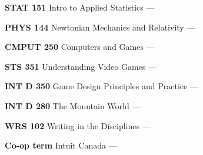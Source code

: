 \begin{cventries}
{\begin{multicols}{2}
\begin{cvitems}
        \item {\textbf{STAT 151} Intro to Applied Statistics --- }
          \vspace{0.5mm}
        \item {\textbf{PHYS 144} Newtonian Mechanics and Relativity --- }
          \vspace{1.5mm}
        \item {\textbf{CMPUT 250} Computers and Games --- }
          \vspace{0.5mm}
        \item {\textbf{STS 351} Understanding Video Games --- }
          \vspace{0.5mm}
        \item {\textbf{INT D 350} Game Design Principles and Practice --- }
          \vspace{1.5mm}
        \item {\textbf{INT D 280} The Mountain World --- }
          \vspace{0.5mm}
        \item {\textbf{WRS 102} Writing in the Disciplines --- }
          \vspace{1.5mm}
        \item {\textbf{Co-op term} Intuit Canada --- }
          \vspace{1.5mm}
      \end{cvitems}
    \end{multicols}
    }
  \end{cventries}
